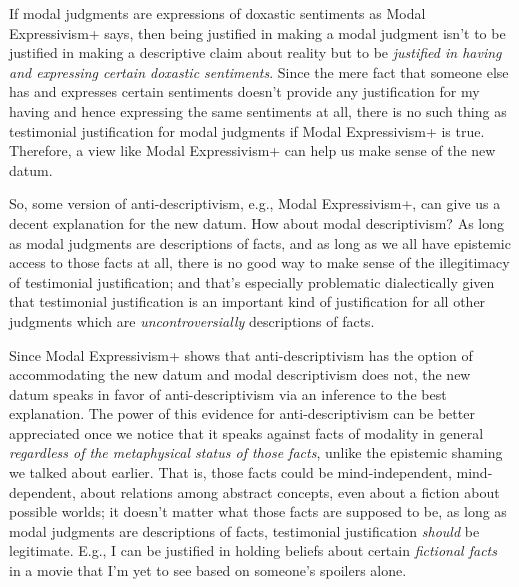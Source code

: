 \documentclass[a4paper,12pt]{article}
\begin{document}
If modal judgments are expressions of doxastic sentiments as Modal Expressivism+ says, then being justified in making a modal judgment isn't to be justified in making a descriptive claim about reality but to be \emph{justified in having and expressing certain doxastic sentiments}. Since the mere fact that someone else has and expresses certain sentiments doesn't provide any justification for my having and hence expressing the same sentiments at all, there is no such thing as testimonial justification for modal judgments if Modal Expressivism+ is true. Therefore, a view like Modal Expressivism+ can help us make sense of the new datum.

So, some version of anti-descriptivism, e.g., Modal Expressivism+, can give us a decent explanation for the new datum. How about modal descriptivism? As long as modal judgments are descriptions of facts, and as long as we all have epistemic access to those facts at all, there is no good way to make sense of the illegitimacy of testimonial justification; and that's especially problematic dialectically given that testimonial justification is an important kind of justification for all other judgments which are \emph{uncontroversially} descriptions of facts.\footnotemark


Since Modal Expressivism+ shows that anti-descriptivism has the option of accommodating the new datum and modal descriptivism does not, the new datum speaks in favor of anti-descriptivism via an inference to the best explanation. The power of this evidence for anti-descriptivism can be better appreciated once we notice that it speaks against facts of modality in general \emph{regardless of the metaphysical status of those facts}, unlike the epistemic shaming we talked about earlier. That is, those facts could be mind-independent, mind-dependent, about relations among abstract concepts, even about a fiction about possible worlds; it doesn't matter what those facts are supposed to be, as long as modal judgments are descriptions of facts, testimonial justification \emph{should} be legitimate. E.g., I can be justified in holding beliefs about certain \emph{fictional facts} in a movie that I'm yet to see based on someone's spoilers alone.
\end{document}
